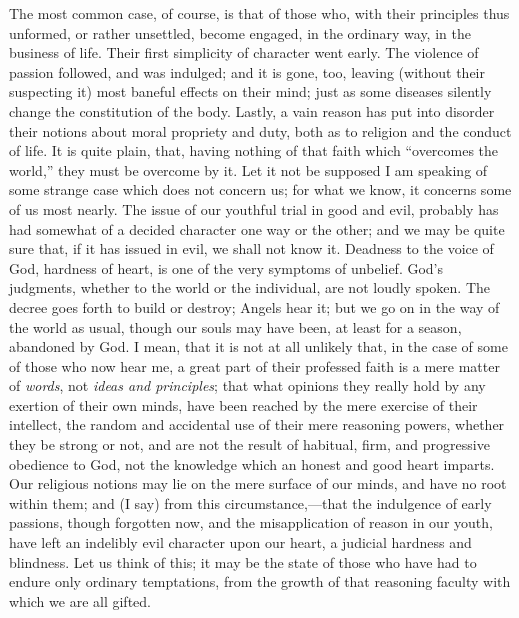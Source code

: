 The most common case, of course, is that of those who,
with their principles thus unformed, or rather unsettled,
become engaged, in the ordinary way, in the business of
life. Their first simplicity of character went early. The
violence of passion followed, and was indulged; and it is
gone, too, leaving (without their suspecting it) most
baneful effects on their mind; just as some diseases
silently change the constitution of the body. Lastly, a
vain reason has put into disorder their notions about
moral propriety and duty, both as to religion and the
conduct of life. It is quite plain, that, having nothing
of that faith which ``overcomes the world,'' they
must be overcome by it. Let it not be supposed I am
speaking of some strange case which does not concern us;
for what we know, it concerns some of us most nearly. The
issue of our youthful trial in good and evil, probably
has had somewhat of a decided character one way or the
other; and we may be quite sure that, if it has issued in
evil, we shall not know it. Deadness to the voice of God,
hardness of heart, is one of the very symptoms of
unbelief. God's judgments, whether to the world or the
individual, are not loudly spoken. The decree goes forth
to build or destroy; Angels hear it; but we go on in the
way of the world as usual, though our souls may have
been, at least for a season, abandoned by God. I mean,
that it is not at all unlikely that, in the case of some
of those who now hear me, a great part of their professed
faith is a mere matter of \emph{words}, not \emph{ideas
and principles}; that what opinions they really hold
by any exertion of their own minds, have been reached by
the mere exercise of their intellect, the random and
accidental use of their mere reasoning powers, whether
they be strong or not, and are not the result of
habitual, firm, and progressive obedience to God, not the
knowledge which an honest and good heart imparts. Our
religious notions may lie on the mere surface of our
minds, and have no root within them; and (I say) from
this circumstance,—that the indulgence of early
passions, though forgotten now, and the misapplication of
reason in our youth, have left an indelibly evil
character upon our heart, a judicial hardness and
blindness. Let us think of this; it may be the state of
those who have had to endure only ordinary temptations,
from the growth of that reasoning faculty with which we
are all gifted.

